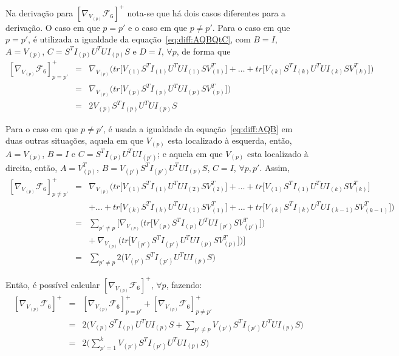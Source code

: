 \documentclass[
    12pt,                %
    oneside,            %
    a4paper,            %
    english,            %
    brazil                %
    ]{abntex2ppgsi}
\begin{document}
Na derivação para $[\nabla_{V_{(p)}} \mathcal{F}_6]^+$ nota-se que há dois casos diferentes para a derivação. O caso em que $p = p'$ e o caso em que $p \neq p'$. Para o caso em que $p = p'$, é utilizada a igualdade da equação~\ref{eq:diff:AQBQtC}, com $B = I$, $A = V_{(p)}$, $C = S^T I_{(p)} U^T U I_{(p)} S$ e $D = I$, $\forall p$, de forma que
\[
    \begin{array}{lcl}
        [\nabla_{V_{(p)}} \mathcal{F}_6]^{+}_{p=p'} & = & \nabla_{V_{(p)}} \Big( tr\big[ V_{(1)} S^T I_{(1)} U^T U I_{(1)} S V_{(1)}^T \big] + \dots + tr\big[ V_{(k)} S^T I_{(k)} U^T U I_{(k)} S V_{(k)}^T \big] \Big) \\
                                                    & = & \nabla_{V_{(p)}} \Big( tr\big[ V_{(p)} S^T I_{(p)} U^T U I_{(p)} S V_{(p)}^T \big] \Big)  \\
                                                    & = & 2 V_{(p)} S^T I_{(p)} U^T U I_{(p)} S
    \end{array}
\]

Para o caso em que $p \neq p'$, é usada a igualdade da equação~\ref{eq:diff:AQB} em duas outras situações, aquela em que $V_{(p)}$ esta localizado à esquerda, então, $A = V_{(p)}$, $B = I$ e $C = S^T I_{(p)} U^T U I_{(p')}$; e aquela em que $V_{(p)}$ esta localizado à direita, então, $A = V_{(p)}^T$, $B = V_{(p')} S^T I_{(p')} U^T U I_{(p)} S$, $C = I$, $\forall p, p'$. Assim,
\[
    \begin{array}{lcl}
        [\nabla_{V_{(p)}} \mathcal{F}_6]^{+}_{p \neq p'} & = & \nabla_{V_{(p)}} \Big( tr\big[ V_{(1)} S^T I_{(1)} U^T U I_{(2)} S V_{(2)}^T \big] + \dots + tr\big[ V_{(1)} S^T I_{(1)} U^T U I_{(k)} S V_{(k)}^T \big] \\
                                   &   & + \dots + tr\big[ V_{(k)} S^T I_{(k)} U^T U I_{(1)} S V_{(1)}^T \big] + \dots + tr\big[ V_{(k)} S^T I_{(k)} U^T U I_{(k-1)} S V_{(k-1)}^T \big] \Big) \\
                                   & = & \sum_{p' \neq p} \bigg[ \nabla_{V_{(p)}} \Big( tr\big[ V_{(p)} S^T I_{(p)} U^T U I_{(p')} S V_{(p')}^T \big] \Big) \\
                                   &   & + ~ \nabla_{V_{(p)}} \Big( tr\big[ V_{(p')} S^T I_{(p')} U^T U I_{(p)} S V_{(p)}^T \big] \Big) \bigg] \\
                                   & = & \sum_{p' \neq p} 2 \big( V_{(p')} S^T I_{(p')} U^T U I_{(p)} S \big)
    \end{array}
\]

Então, é possível calcular $[\nabla_{V_{(p)}} \mathcal{F}_6]^{+}$, $\forall p$, fazendo:
\[
    \begin{array}{lcl}
        [\nabla_{V_{(p)}} \mathcal{F}_6]^{+} & = & [\nabla_{V_{(p)}} \mathcal{F}_6]^{+}_{p = p'} + [\nabla_{V_{(p)}} \mathcal{F}_6]^{+}_{p \neq p'} \\
                                             & = & 2 \big( V_{(p)} S^T I_{(p)} U^T U I_{(p)} S + \sum_{p' \neq p} V_{(p')} S^T I_{(p')} U^T U I_{(p)} S \big) \\
                                             & = & 2 \big( \sum_{p'=1}^{k} V_{(p')} S^T I_{(p')} U^T U I_{(p)} S \big)
    \end{array}
\]
\end{document}
